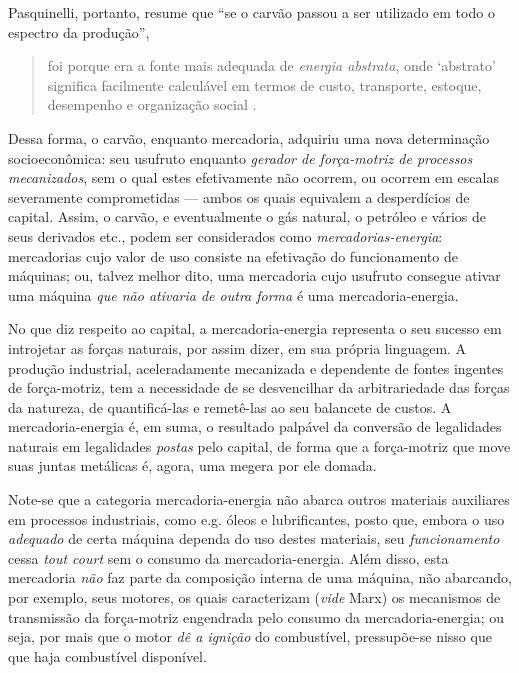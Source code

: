 Pasquinelli, portanto, resume que ``se o carvão passou a ser utilizado em todo o espectro da produção'',
\begin{quote}
foi porque era a fonte mais adequada de \emph{energia abstrata}, onde `abstrato' significa facilmente calculável em termos de custo, transporte, estoque, desempenho e organização social \parencite[p. 122-3, grifo no original]{Pasquinelli2023}.
\end{quote}

Dessa forma, o carvão, enquanto mercadoria, adquiriu uma nova determinação socioeconômica: seu usufruto enquanto \textit{gerador de força-motriz de processos mecanizados}, sem o qual estes efetivamente não ocorrem, ou ocorrem em escalas severamente comprometidas --- ambos os quais equivalem a desperdícios de capital. Assim, o carvão, e eventualmente o gás natural, o petróleo e vários de seus derivados etc., podem ser considerados como \textit{mercadorias-energia}: mercadorias cujo valor de uso consiste na efetivação do funcionamento de máquinas; ou, talvez melhor dito, uma mercadoria cujo usufruto consegue ativar uma máquina \textit{que não ativaria de outra forma} é uma mercadoria-energia.

No que diz respeito ao capital, a mercadoria-energia representa o seu sucesso em introjetar as forças naturais, por assim dizer, em sua própria linguagem. A produção industrial, aceleradamente mecanizada e dependente de fontes ingentes de força-motriz, tem a necessidade de se desvencilhar da arbitrariedade das forças da natureza, de quantificá-las e remetê-las ao seu balancete de custos. A mercadoria-energia é, em suma, o resultado palpável da conversão de legalidades naturais em legalidades \textit{postas} pelo capital, de forma que a força-motriz que move suas juntas metálicas é, agora, uma megera por ele domada. 

Note-se que a categoria mercadoria-energia não abarca outros materiais auxiliares em processos industriais, como e.g. óleos e lubrificantes, posto que, embora o uso \textit{adequado} de certa máquina dependa do uso destes materiais, seu \textit{funcionamento} cessa \textit{tout court} sem o consumo da mercadoria-energia. Além disso, esta mercadoria \textit{não} faz parte da composição interna de uma máquina, não abarcando, por exemplo, seus motores, os quais caracterizam (\textit{vide} Marx) os mecanismos de transmissão da força-motriz engendrada pelo consumo da mercadoria-energia; ou seja, por mais que o motor \textit{dê a ignição} do combustível, pressupõe-se nisso que que haja combustível disponível. 

